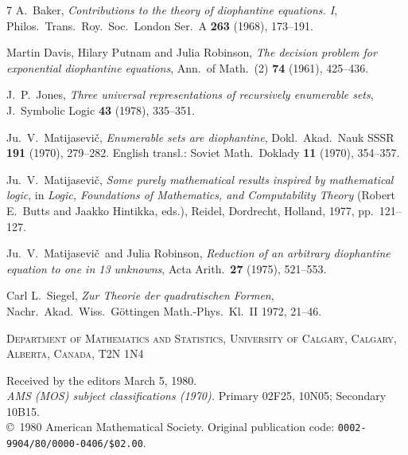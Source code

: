 \documentclass[11pt,letterpaper]{article}
\newcommand{\Matijasevic}{Matijasevi\v{c}}
\begin{document}
\begin{thebibliography}{7}
\small
{}
A.~Baker, \textit{Contributions to the theory of diophantine equations. I},
Philos.\ Trans.\ Roy.\ Soc.\ London Ser.~A \textbf{263} (1968), 173--191.

Martin Davis, Hilary Putnam and Julia Robinson,
\textit{The decision problem for exponential diophantine equations},
Ann.\ of Math.\ (2) \textbf{74} (1961), 425--436.

J.~P.~Jones, \textit{Three universal representations of recursively
enumerable sets}, J.\ Symbolic Logic \textbf{43} (1978), 335--351.

Ju.~V.~\Matijasevic, \textit{Enumerable sets are diophantine},
Dokl.\ Akad.\ Nauk SSSR \textbf{191} (1970), 279--282.
English transl.: Soviet Math.\ Doklady \textbf{11} (1970), 354--357.

Ju.~V.~\Matijasevic, \textit{Some purely mathematical results inspired by
mathematical logic}, in \textit{Logic, Foundations of Mathematics, and
Computability Theory} (Robert E.~Butts and Jaakko Hintikka, eds.),
Reidel, Dordrecht, Holland, 1977, pp.\ 121--127.

Ju.~V.~\Matijasevic\ and Julia Robinson,
\textit{Reduction of an arbitrary diophantine equation to one in
13 unknowns}, Acta Arith.\ \textbf{27} (1975), 521--553.

Carl L.~Siegel, \textit{Zur Theorie der quadratischen Formen},
Nachr.\ Akad.\ Wiss.\ G\"ottingen Math.-Phys.\ Kl.~II 1972, 21--46.
\end{thebibliography}

\vspace{0.5em}
\noindent\small\textsc{Department of Mathematics and Statistics,
University of Calgary, Calgary, Alberta, Canada, T2N 1N4}

\vspace{1em}
\noindent\footnotesize
Received by the editors March 5, 1980.\\
\textit{AMS (MOS) subject classifications (1970).}
Primary 02F25, 10N05; Secondary 10B15.\\
\copyright\ 1980 American Mathematical Society. Original publication code:
\texttt{0002-9904/80/0000-0406/\$02.00}.
\end{document}
